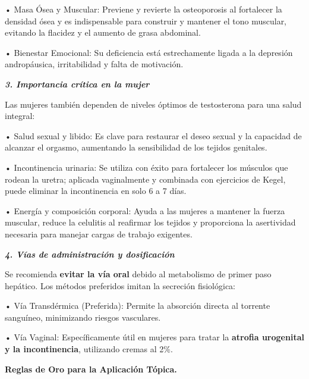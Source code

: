 \documentclass[
  spanish,
]{article}
\begin{document}
• Masa Ósea y Muscular: Previene y revierte la osteoporosis al fortalecer la densidad ósea y es indispensable para construir y mantener el tono muscular, evitando la flacidez y el aumento de grasa abdominal.

• Bienestar Emocional: Su deficiencia está estrechamente ligada a la depresión andropáusica, irritabilidad y falta de motivación.

\textbf{\emph{3. Importancia crítica en la mujer}}

Las mujeres también dependen de niveles óptimos de testosterona para una salud integral:

• Salud sexual y libido: Es clave para restaurar el deseo sexual y la capacidad de alcanzar el orgasmo, aumentando la sensibilidad de los tejidos genitales.

• Incontinencia urinaria: Se utiliza con éxito para fortalecer los músculos que rodean la uretra; aplicada vaginalmente y combinada con ejercicios de Kegel, puede eliminar la incontinencia en solo 6 a 7 días.

• Energía y composición corporal: Ayuda a las mujeres a mantener la fuerza muscular, reduce la celulitis al reafirmar los tejidos y proporciona la asertividad necesaria para manejar cargas de trabajo exigentes.

\textbf{\emph{4. Vías de administración y dosificación}}

Se recomienda \textbf{evitar la vía oral} debido al metabolismo de primer paso hepático. Los métodos preferidos imitan la secreción fisiológica:

• Vía Transdérmica (Preferida): Permite la absorción directa al torrente sanguíneo, minimizando riesgos vasculares.

• Vía Vaginal: Específicamente útil en mujeres para tratar la \textbf{atrofia urogenital y la incontinencia}, utilizando cremas al 2\%.

\textbf{Reglas de Oro para la Aplicación Tópica.}
\end{document}
